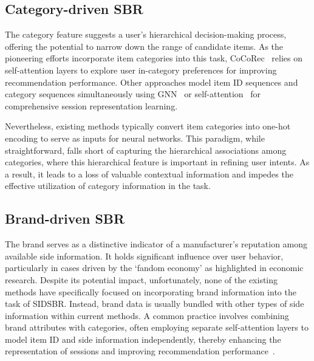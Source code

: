 \documentclass[lettersize,journal]{IEEEtran}
\newcommand{\baby}{{SIDSBR}\xspace}
\begin{document}
\subsection{Category-driven SBR}\label{catesbr}

The category feature suggests a user’s hierarchical decision-making process, offering the potential to narrow down the range of candidate items. As the pioneering efforts incorporate item categories into this task, CoCoRec~\cite{cai@SIGIR2021} relies on self-attention layers to explore user in-category preferences for improving recommendation performance. Other approaches model item ID sequences and category sequences simultaneously using GNN~\cite{lai@SIGIR2022} or self-attention~\cite{Zhou@CIKM2020} for comprehensive session representation learning. 

Nevertheless, existing methods typically convert item categories into one-hot encoding to serve as inputs for neural networks. This paradigm, while straightforward, falls short of capturing the hierarchical associations among categories, where this hierarchical feature is important in refining user intents. As a result, it leads to a loss of valuable contextual information and impedes the effective utilization of category information in the task.

\subsection{Brand-driven SBR}\label{brandsbr}
The brand serves as a distinctive indicator of a manufacturer's reputation among available side information. It holds significant influence over user behavior, particularly in cases driven by the `fandom economy' as highlighted in economic research. Despite its potential impact, unfortunately, none of the existing methods have specifically focused on incorporating brand information into the task of \baby. Instead, brand data is usually bundled with other types of side information within current methods. A common practice involves combining brand attributes with categories, often employing separate self-attention layers to model item ID and side information independently, thereby enhancing the representation of sessions and improving recommendation performance~\cite{zhang@IJCAI2019,song@CIKM2021,Liu@RecSys2023}.   
\end{document}
